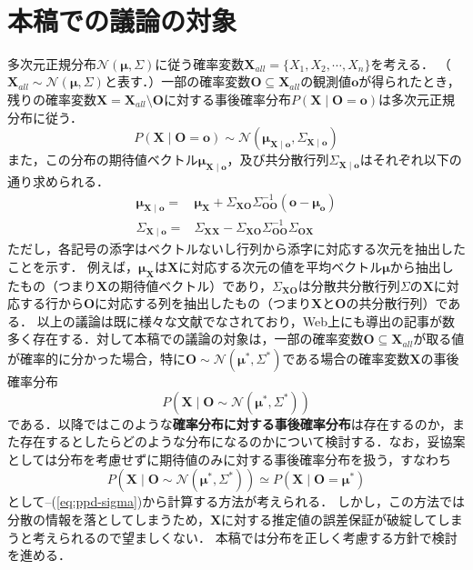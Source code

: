 
\maketitle
​
\section{本稿での議論の対象}
​
多次元正規分布$\mathcal{N}\left( \bm{\mu}, \Sigma \right)$に従う確率変数$\bm{X}_{all} = \{X_1, X_2, \cdots, X_n\}$を考える．
（$\bm{X}_{all} \sim \mathcal{N}\left( \bm{\mu}, \Sigma \right)$と表す．）
​
一部の確率変数$\bm{O} \subseteq \bm{X}_{all}$の観測値$\bm{o}$が得られたとき，残りの確率変数$\bm{X} = \bm{X}_{all} \setminus \bm{O}$に対する事後確率分布$P\left( \bm{X} \mid \bm{O} = \bm{o} \right)$は多次元正規分布に従う．
​
\begin{equation}
  P\left( \bm{X} \mid \bm{O} = \bm{o} \right) \sim \mathcal{N}\left( \bm{\mu_{X \mid o}}, \Sigma_{\bm{X \mid o}} \right) \label{eq:ppd}
\end{equation}
\noindent また，この分布の期待値ベクトル$\bm{\mu_{X \mid o}}$，及び共分散行列$\Sigma_{\bm{X \mid o}}$はそれぞれ以下の通り求められる．
​
\begin{align}
  \bm{\mu_{X \mid o}} = & \bm{\mu_X} + \Sigma_{\bm{XO}}\Sigma_{\bm{OO}}^{-1}\left( \bm{o} - \bm{\mu_o} \right) \label{eq:ppd-mu}\\
  \Sigma_{\bm{X \mid o}} = & \Sigma_{\bm{XX}} - \Sigma_{\bm{XO}}\Sigma_{\bm{OO}}^{-1}\Sigma_{\bm{OX}} \label{eq:ppd-sigma}
\end{align}
\noindent ただし，各記号の添字はベクトルないし行列から添字に対応する次元を抽出したことを示す．
例えば，$\bm{\mu_{X}}$は$\bm{X}$に対応する次元の値を平均ベクトル$\bm{\mu}$から抽出したもの（つまり$\bm{X}$の期待値ベクトル）であり，$\Sigma_{\bm{XO}}$は分散共分散行列$\Sigma$の$\bm{X}$に対応する行から$\bm{O}$に対応する列を抽出したもの（つまり$\bm{X}$と$\bm{O}$の共分散行列）である．
以上の議論は既に様々な文献でなされており，Web上にも導出の記事が数多く存在する．
​
対して本稿での議論の対象は，一部の確率変数$\bm{O} \subseteq \bm{X}_{all}$が取る値が確率的に分かった場合，特に$\bm{O} \sim \mathcal{N}\left( \bm{\mu}^*, \Sigma^* \right)$である場合の確率変数$\bm{X}$の事後確率分布
​
\begin{equation}
  P\left( \bm{X} \mid \bm{O} \sim \mathcal{N}\left( \bm{\mu}^*, \Sigma^* \right) \right) \label{eq:ppd4d}
\end{equation}
\noindent である．以降ではこのような\textbf{確率分布に対する事後確率分布}は存在するのか，また存在するとしたらどのような分布になるのかについて検討する．
​
なお，妥協案としては分布を考慮せずに期待値のみに対する事後確率分布を扱う，すなわち
​
\begin{equation}
  P\left( \bm{X} \mid \bm{O} \sim \mathcal{N}\left( \bm{\mu}^*, \Sigma^* \right) \right) \simeq P\left( \bm{X} \mid \bm{O} = \bm{\mu}^* \right)
\end{equation}
\noindent として\Eq{\ref{eq:ppd}}--(\ref{eq:ppd-sigma})から計算する方法が考えられる．
しかし，この方法では分散の情報を落としてしまうため，$\bm{X}$に対する推定値の誤差保証が破綻してしまうと考えられるので望ましくない．
本稿では分布を正しく考慮する方針で検討を進める．
​
